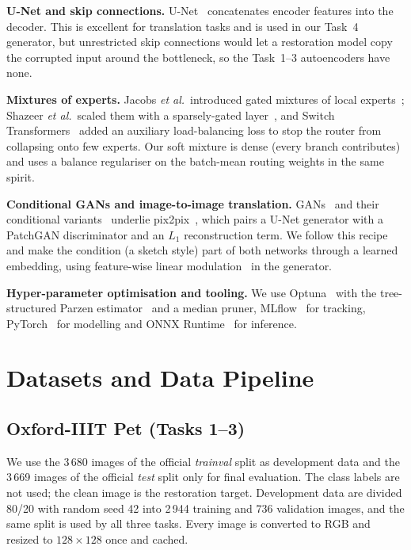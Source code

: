 \documentclass[conference]{IEEEtran}
\begin{document}
\textbf{U-Net and skip connections.} U-Net~\cite{ronneberger2015} concatenates encoder features into the decoder. This is excellent for translation tasks and is used in our
Task~4 generator, but unrestricted skip connections would let a restoration model copy the corrupted input around the bottleneck, so the Task~1--3 autoencoders have none.

\textbf{Mixtures of experts.} Jacobs \emph{et al.}\ introduced gated mixtures of local experts~\cite{jacobs1991}; Shazeer \emph{et al.}\ scaled them with a sparsely-gated layer~\cite{shazeer2017},
and Switch Transformers~\cite{fedus2022} added an auxiliary load-balancing loss to stop the router from collapsing onto few experts. Our soft mixture is dense
(every branch contributes) and uses a balance regulariser on the batch-mean routing weights in the same spirit.

\textbf{Conditional GANs and image-to-image translation.} GANs~\cite{goodfellow2014} and their conditional variants~\cite{mirza2014} underlie pix2pix~\cite{isola2017}, which pairs a
U-Net generator with a PatchGAN discriminator and an $L_1$ reconstruction term. We follow this recipe and make the condition (a sketch style) part of both networks through
a learned embedding, using feature-wise linear modulation~\cite{perez2018} in the generator.

\textbf{Hyper-parameter optimisation and tooling.} We use Optuna~\cite{akiba2019} with the tree-structured Parzen estimator~\cite{bergstra2011} and a median pruner, MLflow~\cite{mlflow} for tracking,
PyTorch~\cite{paszke2019} for modelling and ONNX Runtime~\cite{onnxruntime} for inference.

\section{Datasets and Data Pipeline}
\subsection{Oxford-IIIT Pet (Tasks 1--3)}
We use the 3\,680 images of the official \emph{trainval} split as development data and the 3\,669 images of the official \emph{test} split only for final evaluation.
The class labels are not used; the clean image is the restoration target. Development data are divided 80/20 with random seed 42 into 2\,944 training and 736 validation images, and the
same split is used by all three tasks. Every image is converted to RGB and resized to $128\times128$ once and cached.
\end{document}
